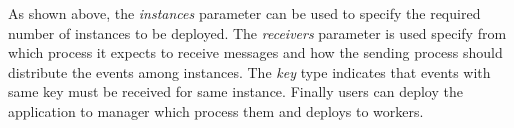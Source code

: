 

As shown above, the \textit{instances} parameter can be used to specify the required number of instances to be deployed. The \textit{receivers} parameter is used specify from which process it expects to receive messages and how the sending process should distribute the events among instances. The \textit{key} type indicates that events with same key must be received for same instance. Finally users can deploy the application to manager which process them and deploys to workers.






 

